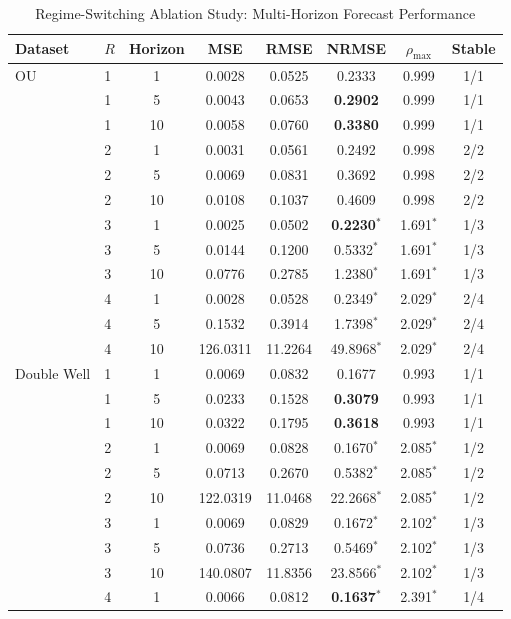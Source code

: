 \begin{table}[h!]
\centering
\caption{Regime-Switching Ablation Study: Multi-Horizon Forecast Performance}
\label{tab:regime-ablation}
\begin{tabular}{llcccccc}
\toprule
Dataset & $R$ & Horizon & MSE & RMSE & NRMSE & $\rho_{\max}$ & Stable \\
\midrule
OU & 1 & 1 & 0.0028 & 0.0525 & 0.2333 & 0.999 & 1/1 \\
 & 1 & 5 & 0.0043 & 0.0653 & \textbf{0.2902} & 0.999 & 1/1 \\
 & 1 & 10 & 0.0058 & 0.0760 & \textbf{0.3380} & 0.999 & 1/1 \\
 & 2 & 1 & 0.0031 & 0.0561 & 0.2492 & 0.998 & 2/2 \\
 & 2 & 5 & 0.0069 & 0.0831 & 0.3692 & 0.998 & 2/2 \\
 & 2 & 10 & 0.0108 & 0.1037 & 0.4609 & 0.998 & 2/2 \\
 & 3 & 1 & 0.0025 & 0.0502 & \textbf{0.2230}$^*$ & 1.691$^*$ & 1/3 \\
 & 3 & 5 & 0.0144 & 0.1200 & 0.5332$^*$ & 1.691$^*$ & 1/3 \\
 & 3 & 10 & 0.0776 & 0.2785 & 1.2380$^*$ & 1.691$^*$ & 1/3 \\
 & 4 & 1 & 0.0028 & 0.0528 & 0.2349$^*$ & 2.029$^*$ & 2/4 \\
 & 4 & 5 & 0.1532 & 0.3914 & 1.7398$^*$ & 2.029$^*$ & 2/4 \\
 & 4 & 10 & 126.0311 & 11.2264 & 49.8968$^*$ & 2.029$^*$ & 2/4 \\
\midrule
Double Well & 1 & 1 & 0.0069 & 0.0832 & 0.1677 & 0.993 & 1/1 \\
 & 1 & 5 & 0.0233 & 0.1528 & \textbf{0.3079} & 0.993 & 1/1 \\
 & 1 & 10 & 0.0322 & 0.1795 & \textbf{0.3618} & 0.993 & 1/1 \\
 & 2 & 1 & 0.0069 & 0.0828 & 0.1670$^*$ & 2.085$^*$ & 1/2 \\
 & 2 & 5 & 0.0713 & 0.2670 & 0.5382$^*$ & 2.085$^*$ & 1/2 \\
 & 2 & 10 & 122.0319 & 11.0468 & 22.2668$^*$ & 2.085$^*$ & 1/2 \\
 & 3 & 1 & 0.0069 & 0.0829 & 0.1672$^*$ & 2.102$^*$ & 1/3 \\
 & 3 & 5 & 0.0736 & 0.2713 & 0.5469$^*$ & 2.102$^*$ & 1/3 \\
 & 3 & 10 & 140.0807 & 11.8356 & 23.8566$^*$ & 2.102$^*$ & 1/3 \\
 & 4 & 1 & 0.0066 & 0.0812 & \textbf{0.1637}$^*$ & 2.391$^*$ & 1/4 \\

\end{tabular}
\end{table}
